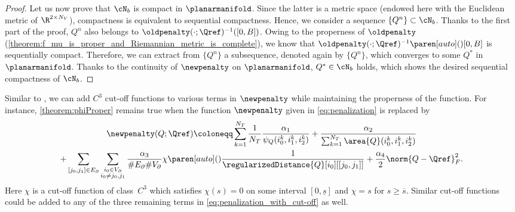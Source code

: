 \begin{proof}
	Let us now prove that $\cN_b$ is compact in $\planarmanifold$.
	Since the latter is a metric space (endowed here with the Euclidean metric of $\R^{2 \times N_V}$), compactness is equivalent to sequential compactness.
	Hence, we consider a sequence $\{Q^n\} \subset \cN_b$.
	Thanks to the first part of the proof, $Q^n$ also belongs to $\oldpenalty(\cdot;\Qref)^{-1}([0,B])$.
	Owing to the properness of $\oldpenalty$ (\cref{theorem:f_mu_is_proper_and_Riemannian_metric_is_complete}), we know that $\oldpenalty(\cdot;\Qref)^{-1}\paren[auto](){[0,B]}$ is sequentially compact.
	Therefore, we can extract from $\{Q^n\}$ a subsequence, denoted again by $\{Q^n\}$, which converges to some $Q^*$ in $\planarmanifold$.
	Thanks to the continuity of $\newpenalty$ on $\planarmanifold$, $Q^* \in \cN_b$ holds, which shows the desired sequential compactness of $\cN_b$.
\end{proof}

\begin{remark}
	\label{remark:addCutOffAugmentation}
	Similar to \cite[Remark~4.13]{HerzogLoayzaRomero:2022:1}, we can add $C^3$ cut-off functions to various terms in $\newpenalty$ while maintaining the properness of the function.
	For instance, \cref{theorem:phiProper} remains true when the function $\newpenalty$ given in \eqref{eq:penalization} is replaced by
	\begin{multline}
		\label{eq:penalization_with_cut-off}
			\newpenalty(Q;\Qref)
			\coloneqq
			\sum_{k=1}^{N_T} \frac{1}{N_T} \frac{\alpha_1}{\psi_Q(i_0^k,i_1^k,i_2^k)}
			+
			\frac{\alpha_2}{\sum_{k=1}^{N_T}\area{Q}(i_0^k,i_1^k,i_2^k)}
			\\
			+
			\sum_{[j_0,j_1]\in E_\partial}
			\sum_{\substack{i_0 \in V_\partial \\ i_0 \neq j_0,j_1}} \frac{\alpha_3}{\#E_\partial \#V_\partial} \chi \paren[auto](){\frac{1}{\regularizedDistance{Q}[i_0][[j_0,j_1]]}}
			+
			\frac{\alpha_4}{2} \norm{Q-\Qref}_F^2
			.
	\end{multline}
	Here $\chi$ is a cut-off function of class~$C^3$ which satisfies $\chi(s) = 0$ on some interval $[0,\underline{s}]$ and $\chi = s$ for $s \ge \overline{s}$.
	Similar cut-off functions could be added to any of the three remaining terms in \eqref{eq:penalization_with_cut-off} as well.
\end{remark}

